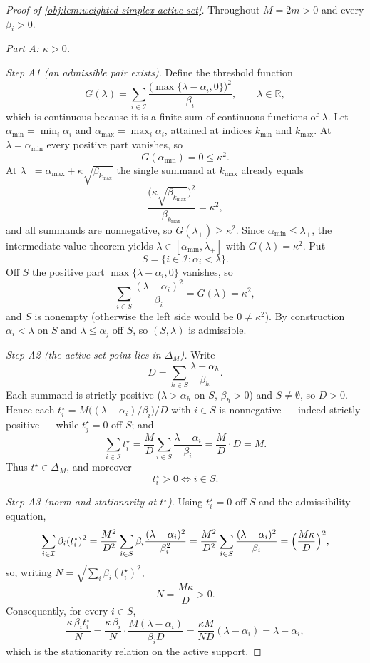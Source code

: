 \begin{proof}[Proof of \cref{obj:lem:weighted-simplex-active-set}]
Throughout \(M=2m>0\) and every \(\beta_i>0\).

\emph{Part A: \(\kappa>0\).}

\emph{Step A1 (an admissible pair exists).}  Define the threshold function
\[
G(\lambda)=\sum_{i\in\mathcal I}\frac{\bigl(\max\{\lambda-\alpha_i,0\}\bigr)^2}{\beta_i},
\qquad\lambda\in\mathbb R,
\]
which is continuous because it is a finite sum of continuous functions of \(\lambda\).  Let \(\alpha_{\min}=\min_i\alpha_i\) and \(\alpha_{\max}=\max_i\alpha_i\), attained at indices \(k_{\min}\) and \(k_{\max}\).  At \(\lambda=\alpha_{\min}\) every positive part vanishes, so
\[
G(\alpha_{\min})=0\le\kappa^2 .
\]
At \(\lambda_{+}=\alpha_{\max}+\kappa\sqrt{\beta_{k_{\max}}}\) the single summand at \(k_{\max}\) already equals
\[
\frac{\bigl(\kappa\sqrt{\beta_{k_{\max}}}\bigr)^2}{\beta_{k_{\max}}}=\kappa^2,
\]
and all summands are nonnegative, so \(G(\lambda_{+})\ge\kappa^2\).  Since \(\alpha_{\min}\le\lambda_{+}\), the intermediate value theorem yields \(\lambda\in[\alpha_{\min},\lambda_{+}]\) with \(G(\lambda)=\kappa^2\).  Put
\[
S=\{i\in\mathcal I:\alpha_i<\lambda\}.
\]
Off \(S\) the positive part \(\max\{\lambda-\alpha_i,0\}\) vanishes, so
\[
\sum_{i\in S}\frac{(\lambda-\alpha_i)^2}{\beta_i}=G(\lambda)=\kappa^2 ,
\]
and \(S\) is nonempty (otherwise the left side would be \(0\ne\kappa^2\)).  By construction \(\alpha_i<\lambda\) on \(S\) and \(\lambda\le\alpha_j\) off \(S\), so \((S,\lambda)\) is admissible. %

\emph{Step A2 (the active-set point lies in \(\Delta_M\)).}  Write
\[
D=\sum_{h\in S}\frac{\lambda-\alpha_h}{\beta_h}.
\]
Each summand is strictly positive (\(\lambda>\alpha_h\) on \(S\), \(\beta_h>0\)) and \(S\ne\emptyset\), so \(D>0\).  Hence each \(t_i^\star=M\bigl((\lambda-\alpha_i)/\beta_i\bigr)/D\) with \(i\in S\) is nonnegative --- indeed strictly positive --- while \(t_j^\star=0\) off \(S\); and
\[
\sum_{i\in\mathcal I}t_i^\star
=\frac{M}{D}\sum_{i\in S}\frac{\lambda-\alpha_i}{\beta_i}
=\frac{M}{D}\cdot D=M .
\]
Thus \(t^\star\in\Delta_M\), and moreover
\[
t_i^\star>0\iff i\in S .
\]

\emph{Step A3 (norm and stationarity at \(t^\star\)).}  Using \(t_i^\star=0\) off \(S\) and the admissibility equation,
\[
\sum_{i\in\mathcal I}\beta_i(t_i^\star)^2
=\frac{M^2}{D^2}\sum_{i\in S}\beta_i\frac{(\lambda-\alpha_i)^2}{\beta_i^2}
=\frac{M^2}{D^2}\sum_{i\in S}\frac{(\lambda-\alpha_i)^2}{\beta_i}
=\Bigl(\frac{M\kappa}{D}\Bigr)^2 ,
\]
so, writing \(N=\sqrt{\sum_i\beta_i(t_i^\star)^2}\),
\[
N=\frac{M\kappa}{D}>0 .
\]
Consequently, for every \(i\in S\),
\[
\frac{\kappa\,\beta_i t_i^\star}{N}
=\frac{\kappa\,\beta_i}{N}\cdot\frac{M(\lambda-\alpha_i)}{\beta_iD}
=\frac{\kappa M}{ND}(\lambda-\alpha_i)
=\lambda-\alpha_i ,
\]
which is the stationarity relation on the active support.


\end{proof}
